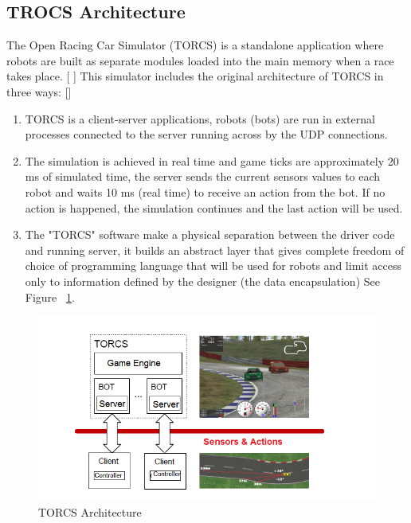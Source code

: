 \documentclass{llncs}
\begin{document}
\subsection {TROCS Architecture}
The Open Racing Car Simulator (TORCS) is a standalone application where robots are built as separate modules loaded into the main memory when a race takes place. [\cite{Torcs3} ]
This simulator includes the original architecture of TORCS in three ways: [\cite {manual}]
\begin{enumerate}
	\item TORCS is a client-server applications, robots (bots) are run in external processes connected to the server running across by the UDP connections.\\
	
	\item The simulation is achieved in real time and  game ticks are approximately 20 ms of simulated time, the server sends the current sensors values to each robot and waits 10 ms (real time) to receive an action from the bot.
	If no action is happened, the simulation continues and the last action will be used.\\
	
	\item The "TORCS" software make a physical separation between the driver code and running server, it builds an abstract layer that gives complete freedom of choice of programming language that will be used for robots and limit access only to information defined by the designer (the data encapsulation) See Figure ~\ref{architorcs}.
\end{enumerate}
\begin{figure}[h!]
	\centering
	\includegraphics[width=1.1\textwidth]{fig/arch2.png}
	\begin{minipage}{10cm}
		\centering
		
		\caption{\footnotesize TORCS Architecture}
		\label{architorcs}
	\end{minipage} 
\end{figure}
\end{document}
